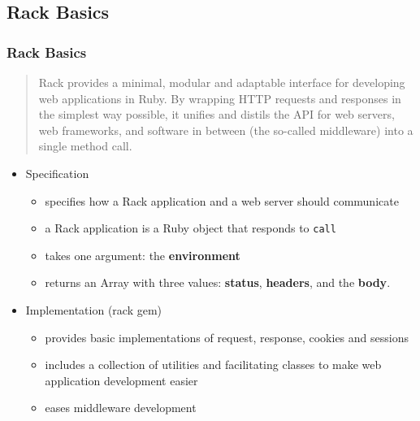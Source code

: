 \documentclass{beamer}
\begin{document}
\subsection{Rack Basics} 
\begin{frame}\frametitle{Rack Basics}
 
  \begin{quote}
    Rack provides a minimal, modular and adaptable interface for developing web applications in Ruby. By wrapping HTTP requests and responses in the simplest way possible, it unifies and distils the API for web servers, web frameworks, and software in between (the so-called middleware) into a single method call.
  \end{quote}   
 
  \begin{itemize}
  
    \item Specification
    \begin{itemize}
      \item specifies how a Rack application and a web server should communicate
      \item a Rack application is a Ruby object that responds to \texttt{call}
      \item takes one argument: the \textbf{environment}
      \item returns an Array with three values: \textbf{status}, \textbf{headers}, and the \textbf{body}.
    \end{itemize}
    
    \item Implementation (rack gem)
    \begin{itemize}
      \item provides basic implementations of request, response, cookies and sessions
      \item includes a collection of utilities and facilitating classes to make web application development easier
      \item eases middleware development
    \end{itemize}
    
        
  \end{itemize}

\end{frame}
\end{document}
